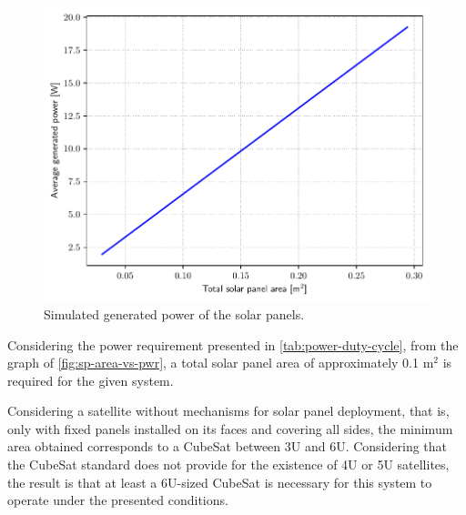 \begin{figure}[!ht]
    \begin{center}
        \includegraphics[width=0.8\columnwidth]{curves/sp-area-vs-pwr.pdf}
        \caption{Simulated generated power of the solar panels.}
        \label{fig:sp-area-vs-pwr}
    \end{center}
\end{figure}

Considering the power requirement presented in \autoref{tab:power-duty-cycle}, from the graph of \autoref{fig:sp-area-vs-pwr}, a total solar panel area of approximately 0.1 m$^{2}$ is required for the given system.



Considering a satellite without mechanisms for solar panel deployment, that is, only with fixed panels installed on its faces and covering all sides, the minimum area obtained corresponds to a CubeSat between 3U and 6U. Considering that the CubeSat standard does not provide for the existence of 4U or 5U satellites, the result is that at least a 6U-sized CubeSat is necessary for this system to operate under the presented conditions.

